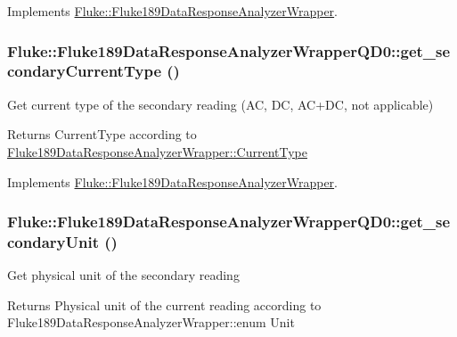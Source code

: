 Implements \hyperlink{classFluke_1_1Fluke189DataResponseAnalyzerWrapper_a28c8a2bcca43f33e1b1becf9d5ffa76c}{Fluke::Fluke189DataResponseAnalyzerWrapper}.\hypertarget{classFluke_1_1Fluke189DataResponseAnalyzerWrapperQD0_aa46ac22750b412df37ae24db84fab138}{
\subsubsection[{get\_\-secondaryCurrentType}]{ Fluke::Fluke189DataResponseAnalyzerWrapperQD0::get\_\-secondaryCurrentType ()}}
\label{classFluke_1_1Fluke189DataResponseAnalyzerWrapperQD0_aa46ac22750b412df37ae24db84fab138}
Get current type of the secondary reading (AC, DC, AC+DC, not applicable) \begin{DoxyReturn}{Returns}
CurrentType according to \hyperlink{classFluke_1_1Fluke189DataResponseAnalyzerWrapper_afef24496da239e3613c40ad3582d7adc}{Fluke189DataResponseAnalyzerWrapper::CurrentType} 
\end{DoxyReturn}


Implements \hyperlink{classFluke_1_1Fluke189DataResponseAnalyzerWrapper_a21a39a54587e31af04c931b46aa11806}{Fluke::Fluke189DataResponseAnalyzerWrapper}.\hypertarget{classFluke_1_1Fluke189DataResponseAnalyzerWrapperQD0_a3f1bdb92d10f341c8b22fa8ee95600b5}{
\subsubsection[{get\_\-secondaryUnit}]{ Fluke::Fluke189DataResponseAnalyzerWrapperQD0::get\_\-secondaryUnit ()}}
\label{classFluke_1_1Fluke189DataResponseAnalyzerWrapperQD0_a3f1bdb92d10f341c8b22fa8ee95600b5}
Get physical unit of the secondary reading \begin{DoxyReturn}{Returns}
Physical unit of the current reading according to Fluke189DataResponseAnalyzerWrapper::enum Unit 
\end{DoxyReturn}


